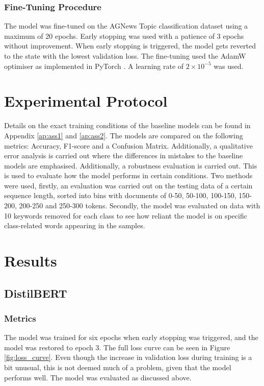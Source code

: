 \documentclass[12pt,a4paper,english]{article}
\begin{document}
\subsubsection{Fine-Tuning Procedure}
The model was fine-tuned on the AGNews Topic classification dataset using a maximum of 20 epochs. Early stopping was used with a patience of 3 epochs without improvement. When early stopping is triggered, the model gets reverted to the state with the lowest validation loss. The fine-tuning used the AdamW optimiser as implemented in PyTorch \cite{paszke2019pytorchimperativestylehighperformance}. A learning rate of $2\times10^{-5}$ was used. 

\section{Experimental Protocol}
Details on the exact training conditions of the baseline models can be found in Appendix \ref{ap:ass1} and \ref{ap:ass2}. The models are compared on the following metrics: Accuracy, F1-score and a Confusion Matrix. Additionally, a qualitative error analysis is carried out where the differences in mistakes to the baseline models are emphasised. Additionally, a robustness evaluation is carried out. This is used to evaluate how the model performs in certain conditions. Two methods were used, firstly, an evaluation was carried out on the testing data of a certain sequence length, sorted into bins with documents of 0-50, 50-100, 100-150, 150-200, 200-250 and 250-300 tokens. Secondly, the model was evaluated on data with 10 keywords removed for each class to see how reliant the model is on specific class-related words appearing in the samples.

\section{Results}
\subsection{DistilBERT}
\subsubsection{Metrics}
The model was trained for six epochs when early stopping was triggered, and the model was restored to epoch 3. The full loss curve can be seen in Figure \ref{fig:loss_curve}. Even though the increase in validation loss during training is a bit unusual, this is not deemed much of a problem, given that the model performs well. The model was evaluated as discussed above. 
\end{document}
